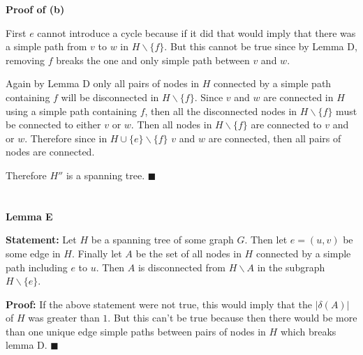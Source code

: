 \documentclass{article}
\newcommand*{\QEDA}{\hfill\ensuremath{\blacksquare}}%
\begin{document}
\textbf{Proof of (b)} 

First $e$ cannot introduce a cycle because if it did that would imply that there was a simple path from $v$ to $w$ in $H \backslash \{f\}$. But this cannot be true since by Lemma D, removing $f$ breaks the one and only simple path between $v$ and $w$. 

Again by Lemma D only all pairs of nodes in $H$ connected by a simple path containing $f$ will be disconnected in $H \backslash \{f\}$. Since $v$ and $w$ are connected in $H$ using a simple path containing $f$, then all the disconnected nodes in $H \backslash \{f\}$ must be connected to either $v$ or $w$. Then all nodes in $H \backslash \{f\}$ are connected to $v$ and or $w$. Therefore since in $H \cup \{e\} \backslash \{f\}$ $v$ and $w$ are connected, then all pairs of nodes are connected. 

Therefore $H''$ is a spanning tree.
\QEDA

\section{}
\textbf{Lemma E}

\textbf{Statement:} Let $H$ be a spanning tree of some graph $G$. Then let $e = (u,v)$ be some edge in $H$. Finally let $A$ be the set of all nodes in $H$ connected by a simple path including $e$  to $u$. Then $A$ is disconnected from $H \backslash A$ in the subgraph $H \backslash \{e\}$.

\textbf{Proof:} If the above statement were not true, this would imply that the $|\delta(A)|$ of $H$ was greater than $1$. But this can't be true because then there would be more than one unique edge simple paths between pairs of nodes in $H$ which breaks lemma D.
\QEDA



 
\end{document}
